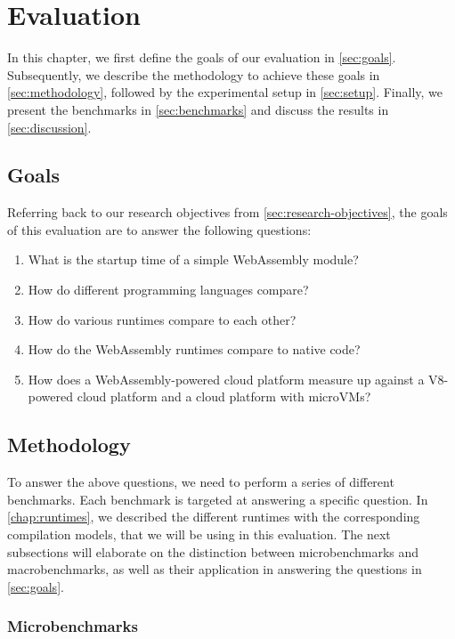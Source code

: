\chapter{Evaluation}
\label{chap:evaluation}

In this chapter, we first define the goals of our evaluation in \autoref{sec:goals}. Subsequently, we describe the methodology to achieve these goals in \autoref{sec:methodology}, followed by the experimental setup in \autoref{sec:setup}. Finally, we present the benchmarks in \autoref{sec:benchmarks} and discuss the results in \autoref{sec:discussion}.

\section{Goals}
\label{sec:goals}
%
Referring back to our research objectives from \autoref{sec:research-objectives}, the goals of this evaluation are to answer the following questions:
\begin{enumerate}
    \item What is the startup time of a simple \gls{WebAssembly} module?
    \item How do different programming languages compare?
    \item How do various runtimes compare to each other?
    \item How do the WebAssembly runtimes compare to native code?
    \item How does a WebAssembly-powered cloud platform measure up against a V8-powered cloud platform and a cloud platform with microVMs?
\end{enumerate}

\section{Methodology}
\label{sec:methodology}

To answer the above questions, we need to perform a series of different benchmarks. Each benchmark is targeted at answering a specific question. In \autoref{chap:runtimes}, we described the different runtimes with the corresponding compilation models, that we will be using in this evaluation. The next subsections will elaborate on the distinction between microbenchmarks and macrobenchmarks, as well as their application in answering the questions in \autoref{sec:goals}.

\subsection{Microbenchmarks}
\label{subsec:microbenchmarks}

